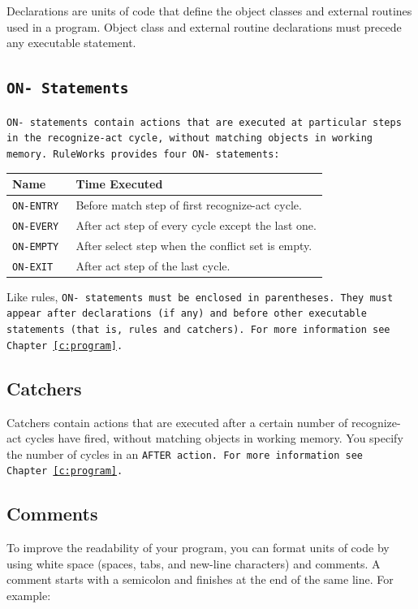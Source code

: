 Declarations are units of code that define the object classes and
external routines used in a program. Object class and external routine
declarations must precede any executable statement.

\subsection{\tt{ON-} Statements}

\tt{ON-} statements contain actions that are executed at particular
steps in the recognize-act cycle, without matching objects in working
memory. RuleWorks provides four \tt{ON-} statements:

\begin{center}
\begin{tabular}{ll}
    \toprule
    Name     & Time Executed               \\
    \midrule
    \tt{ON-ENTRY} & Before match step of first recognize-act cycle. \\
    \tt{ON-EVERY} & After act step of every cycle except the last one. \\
    \tt{ON-EMPTY} & After select step when the conflict set is empty. \\
    \tt{ON-EXIT}  & After act step of the last cycle.  \\
  \bottomrule
\end{tabular}
\end{center}

Like rules, \tt{ON-} statements must be enclosed in parentheses. They
must appear after declarations (if any) and before other executable
statements (that is, rules and catchers). For more information see
Chapter~\ref{c:program}.

\subsection{Catchers}

Catchers contain actions that are executed after a certain number of
recognize-act cycles have fired, without matching objects in working
memory. You specify the number of cycles in an \tt{AFTER} action. For
more information see Chapter~\ref{c:program}.

\subsection{Comments}

To improve the readability of your program, you can format units of
code by using white space (spaces, tabs, and new-line characters) and
comments. A comment starts with a semicolon and finishes at the end of
the same line. For example:

